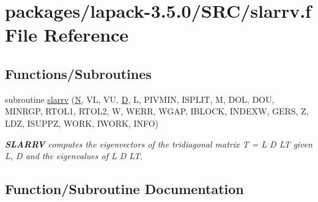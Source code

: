 \hypertarget{slarrv_8f}{}\section{packages/lapack-\/3.5.0/\+S\+R\+C/slarrv.f File Reference}
\label{slarrv_8f}
\subsection*{Functions/\+Subroutines}
\begin{DoxyCompactItemize}
\item 
subroutine \hyperlink{slarrv_8f_af914549478e70da2caeb2612a265650f}{slarrv} (\hyperlink{polmisc_8c_a0240ac851181b84ac374872dc5434ee4}{N}, V\+L, V\+U, \hyperlink{odrpack_8h_a7dae6ea403d00f3687f24a874e67d139}{D}, L, P\+I\+V\+M\+I\+N, I\+S\+P\+L\+I\+T, M, D\+O\+L, D\+O\+U, M\+I\+N\+R\+G\+P, R\+T\+O\+L1, R\+T\+O\+L2, W, W\+E\+R\+R, W\+G\+A\+P, I\+B\+L\+O\+C\+K, I\+N\+D\+E\+X\+W, G\+E\+R\+S, Z, L\+D\+Z, I\+S\+U\+P\+P\+Z, W\+O\+R\+K, I\+W\+O\+R\+K, I\+N\+F\+O)
\begin{DoxyCompactList}\small\item\em {\bfseries S\+L\+A\+R\+R\+V} computes the eigenvectors of the tridiagonal matrix T = L D L\+T given L, D and the eigenvalues of L D L\+T. \end{DoxyCompactList}\end{DoxyCompactItemize}


\subsection{Function/\+Subroutine Documentation}
\hypertarget{slarrv_8f_af914549478e70da2caeb2612a265650f}{}
